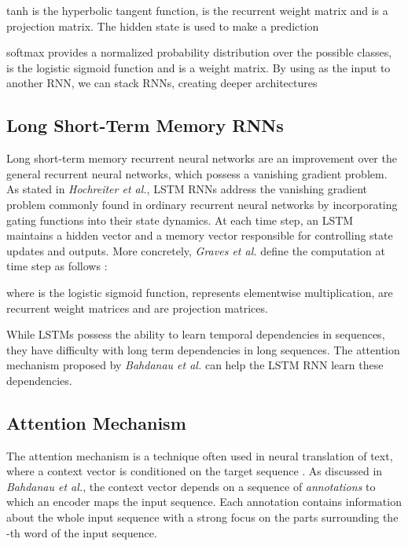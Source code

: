 \documentclass[article]{IEEEtran}
\begin{document}
tanh is the hyperbolic tangent function,  is the recurrent weight matrix and  is a projection matrix. The hidden state  is  used to make a prediction


softmax provides a normalized probability distribution over the possible classes,  is the logistic sigmoid function and  is a weight matrix. By using  as the input to another RNN, we can stack RNNs, creating deeper architectures 



\subsection{Long Short-Term Memory RNNs}
\def\x{{\mathbf x}}

Long short-term memory recurrent neural networks are an improvement over the general recurrent neural networks, which possess a vanishing gradient problem. As stated in \textit{Hochreiter et al.}\cite{hochreiter1997long}, LSTM RNNs address the vanishing gradient problem commonly found in ordinary recurrent neural networks by incorporating gating functions into their state dynamics. At each time step, an LSTM maintains a hidden vector  and a memory vector   responsible for controlling state updates and outputs. More concretely, \textit{Graves et al.} \cite{graves2012supervised} define the computation at time step  as follows :

where  is the logistic sigmoid function,  represents elementwise multiplication,  are recurrent weight matrices and  are projection matrices.

While LSTMs possess the ability to learn temporal dependencies in sequences, they have difficulty with long term dependencies in long sequences. The attention mechanism proposed by \textit{Bahdanau et al.} \cite{bahdanau2014neural} can help the LSTM RNN learn these dependencies. 

\subsection{Attention Mechanism}
The attention mechanism is a technique often used in neural translation of text, where a context vector  is conditioned on the target sequence . As discussed in \textit{Bahdanau et al.}\cite{bahdanau2014neural}, the context vector  depends on a sequence of \textit{annotations}  to which an encoder maps the input sequence. Each annotation  contains information about the whole input sequence with a strong focus on the parts surrounding the -th word of the input sequence.
\end{document}
